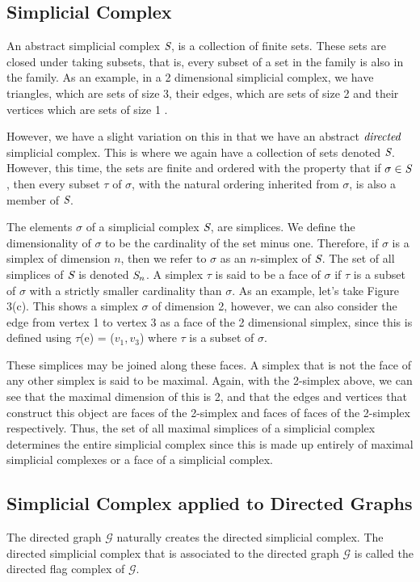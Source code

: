 \subsection{Simplicial Complex}
An abstract simplicial complex $\emph{S}$, is a collection of finite sets. These sets are closed under taking subsets, that is, every subset of a set in the family is also in the family. As an example, in a 2 dimensional simplicial complex, we have triangles, which are sets of size 3, their edges, which are sets of size 2 and their vertices which are sets of size 1 \cite{2008Gregarxiv:0809.4221}.

However, we have a slight variation on this in that we have an abstract $\emph{directed}$ simplicial complex. This is where we again have a collection of sets denoted $\emph{S}$. However, this time, the sets are finite and ordered with the property that if $\sigma \in \emph{S}$, then every subset $\tau$ of $\sigma$, with the natural ordering inherited from $\sigma$, is also a member of $\emph{S}$.

The elements $\sigma$ of a simplicial complex $\emph{S}$, are simplices. We define the dimensionality of $\sigma$ to be the cardinality of the set minus one. Therefore, if $\sigma$ is a simplex of dimension $n$, then we refer to $\sigma$ as an $n$-simplex of $\emph{S}$. The set of all simplices of $\emph{S}$ is denoted $\emph{S}_n$. A simplex $\tau$ is said to be a face of $\sigma$ if $\tau$ is a subset of $\sigma$ with a strictly smaller cardinality than $\sigma$. As an example, let's take Figure 3(c). This shows a simplex $\sigma$ of dimension 2, however, we can also consider the edge from vertex 1 to vertex 3 as a face of the 2 dimensional simplex, since this is defined using $\tau$(e) = ($v_1, v_3$) where $\tau$ is a subset of $\sigma$.

These simplices may be joined along these faces. A simplex that is not the face of any other simplex is said to be maximal. Again, with the 2-simplex above, we can see that the maximal dimension of this is 2, and that the edges and vertices that construct this object are faces of the 2-simplex and faces of faces of the 2-simplex respectively. Thus, the set of all maximal simplices of a simplicial complex determines the entire simplicial complex since this is made up entirely of maximal simplicial complexes or a face of a simplicial complex.

\subsection{Simplicial Complex applied to Directed Graphs}
The directed graph $\mathcal{G}$ naturally creates the directed simplicial complex. The directed simplicial complex that is associated to the directed graph $\mathcal{G}$ is called the directed flag complex of $\mathcal{G}$.

